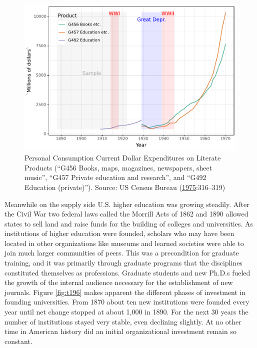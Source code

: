 \documentclass[]{book}
\theoremstyle{definition}
\theoremstyle{definition}
\theoremstyle{definition}
\theoremstyle{remark}
\begin{document}
\begin{figure}

{\centering \includegraphics[width=0.9\linewidth]{04_files/figure-latex/per-con-1} 

}

\caption{Personal Consumption Current Dollar Expenditures on
Literate Products (``G456 Books, maps, magazines, newspapers, sheet
music'', ``G457 Private education and research'', and ``G492 Education
(private)''). Source: US Census Bureau
(\protect\hyperlink{ref-Bureau1975Historical}{1975}:316--319)}\label{fig:per-con}
\end{figure}

Meanwhile on the supply side U.S. higher education was growing steadily.
After the Civil War two federal laws called the Morrill Acts of 1862 and
1890 allowed states to sell land and raise funds for the building of
colleges and universities. As institutions of higher education were
founded, scholars who may have been located in other organizations like
museums and learned societies were able to join much larger communities
of peers. This was a precondition for graduate training, and it was
primarily through graduate programs that the disciplines constituted
themselves as professions. Graduate students and new Ph.D.s fueled the
growth of the internal audience necessary for the establishment of new
journals. Figure \ref{fig:t196} makes apparent the different phases of
investment in founding universities. From 1870 about ten new
institutions were founded every year until net change stopped at about
1,000 in 1890. For the next 30 years the number of institutions stayed
very stable, even declining slightly. At no other time in American
history did an initial organizational investment remain so constant.
\end{document}
